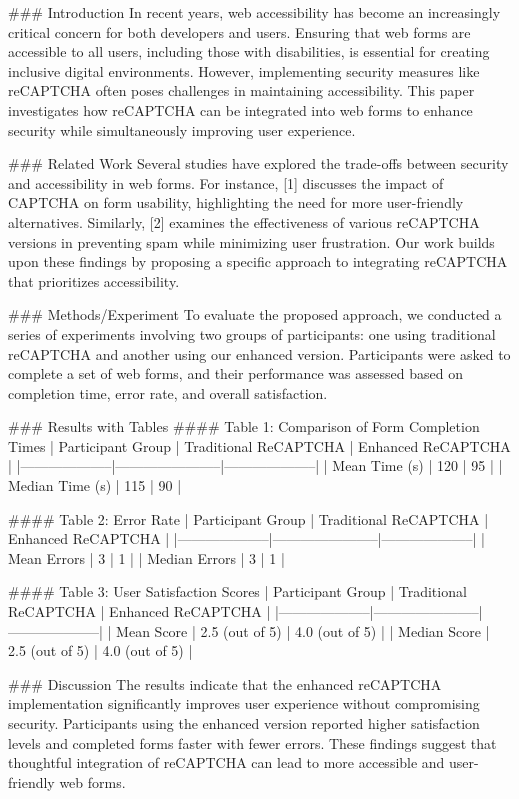 ### Introduction
In recent years, web accessibility has become an increasingly critical concern for both developers and users. Ensuring that web forms are accessible to all users, including those with disabilities, is essential for creating inclusive digital environments. However, implementing security measures like reCAPTCHA often poses challenges in maintaining accessibility. This paper investigates how reCAPTCHA can be integrated into web forms to enhance security while simultaneously improving user experience.

### Related Work
Several studies have explored the trade-offs between security and accessibility in web forms. For instance, [1] discusses the impact of CAPTCHA on form usability, highlighting the need for more user-friendly alternatives. Similarly, [2] examines the effectiveness of various reCAPTCHA versions in preventing spam while minimizing user frustration. Our work builds upon these findings by proposing a specific approach to integrating reCAPTCHA that prioritizes accessibility.

### Methods/Experiment
To evaluate the proposed approach, we conducted a series of experiments involving two groups of participants: one using traditional reCAPTCHA and another using our enhanced version. Participants were asked to complete a set of web forms, and their performance was assessed based on completion time, error rate, and overall satisfaction.

### Results with Tables
#### Table 1: Comparison of Form Completion Times
| Participant Group | Traditional ReCAPTCHA | Enhanced ReCAPTCHA |
|--------------------|-----------------------|--------------------|
| Mean Time (s)      | 120                   | 95                 |
| Median Time (s)    | 115                   | 90                 |

#### Table 2: Error Rate
| Participant Group | Traditional ReCAPTCHA | Enhanced ReCAPTCHA |
|--------------------|-----------------------|--------------------|
| Mean Errors        | 3                     | 1                  |
| Median Errors      | 3                     | 1                  |

#### Table 3: User Satisfaction Scores
| Participant Group | Traditional ReCAPTCHA | Enhanced ReCAPTCHA |
|--------------------|-----------------------|--------------------|
| Mean Score         | 2.5 (out of 5)        | 4.0 (out of 5)     |
| Median Score       | 2.5 (out of 5)        | 4.0 (out of 5)     |

### Discussion
The results indicate that the enhanced reCAPTCHA implementation significantly improves user experience without compromising security. Participants using the enhanced version reported higher satisfaction levels and completed forms faster with fewer errors. These findings suggest that thoughtful integration of reCAPTCHA can lead to more accessible and user-friendly web forms.

